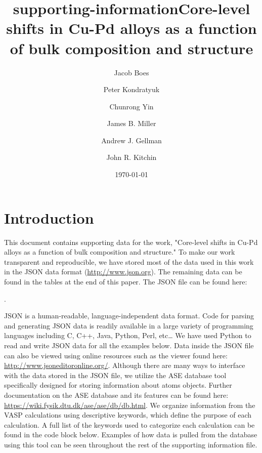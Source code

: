 \documentclass[number, sort&compress, review, 12pt]{elsarticle}
\date{\today}
\title{supporting-information}
\begin{document}
\begin{frontmatter}
\title{Core-level shifts in Cu-Pd alloys as a function of bulk composition and structure}

\author[cmu]{Jacob Boes}
\author[cmu]{Peter Kondratyuk}
\author[cmu]{Chunrong Yin}
\author[cmu]{James B. Miller}
\author[cmu]{Andrew J. Gellman}
\author[cmu]{John R. Kitchin}

\address[cmu]{Department of Chemical Engineering, Carnegie Mellon University, Pittsburgh, PA 15213}

\end{frontmatter}

\tableofcontents

\section{Introduction}
\label{sec-1}
This document contains supporting data for the work, "Core-level shifts in Cu-Pd alloys as a function of bulk composition and structure." To make our work transparent and reproducible, we have stored most of the data used in this work in the JSON data format (\url{http://www.json.org}). The remaining data can be found in the tables at the end of this paper. The JSON file can be found here:

.

JSON is a human-readable, language-independent data format. Code for parsing and generating JSON data is readily available in a large variety of programming languages including C, C++, Java, Python, Perl, etc\ldots{} We have used Python to read and write JSON data for all the examples below. Data inside the JSON file can also be viewed using online resources such as the viewer found here: \url{http://www.jsoneditoronline.org/}. Although there are many ways to interface with the data stored in the JSON file, we utilize the ASE database tool specifically designed for storing information about atoms objects. Further documentation on the ASE database and its features can be found here: \url{https://wiki.fysik.dtu.dk/ase/ase/db/db.html}. We organize information from the VASP calculations using descriptive keywords, which define the purpose of each calculation. A full list of the keywords used to categorize each calculation can be found in the code block below. Examples of how data is pulled from the database using this tool can be seen throughout the rest of the supporting information file.
\end{document}

